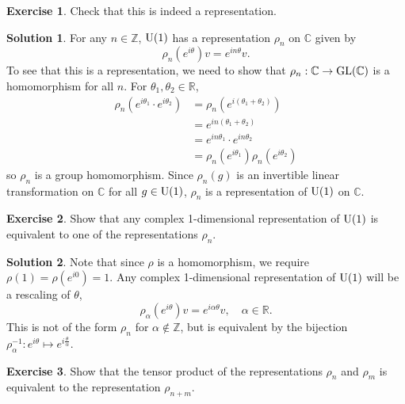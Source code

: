 \documentclass[11pt, a4paper]{report}
\theoremstyle{definition}
\newtheorem{ex}{Exercise}[part]
\newtheorem{sol}{Solution}[part]
\newcommand*{\GL}{\ensuremath\text{GL}}
\newcommand*{\U}{\ensuremath\text{U}}
\begin{document}
\begin{ex}

Check that this is indeed a representation.

\end{ex}

\begin{sol}

For any $n \in \mathbb{Z}$, $\U(1)$ has a representation $\rho_n$ on $\mathbb{C}$ given by
\[
    \rho_n(e^{i\theta}) v = e^{in\theta} v.
\]
To see that this is a representation, we need to show that $\rho_n: \mathbb{C} \to \GL(\mathbb{C})$ is a homomorphism for all $n$.
For $\theta_1, \theta_2 \in \mathbb{R}$,
\begin{align*}
    \rho_n(e^{i\theta_1} \cdot e^{i\theta_2}) &= \rho_n(e^{i(\theta_1 + \theta_2)}) \\
        &= e^{in(\theta_1 + \theta_2)} \\
        &= e^{in\theta_1} \cdot e^{in\theta_2} \\
        &= \rho_n(e^{i\theta_1}) \rho_n(e^{i\theta_2})
\end{align*}
so $\rho_n$ is a group homomorphism. Since $\rho_n(g)$ is an invertible linear transformation on $\mathbb{C}$ for all $g \in \U(1)$, $\rho_n$ is a representation of $\U(1)$ on $\mathbb{C}$.

\end{sol}

\begin{ex}

Show that any complex 1-dimensional representation of $\U(1)$ is equivalent to one of the representations $\rho_n$.

\end{ex}

\begin{sol}

Note that since $\rho$ is a homomorphism, we require $\rho(1) = \rho(e^{i0}) = 1$.
Any complex 1-dimensional representation of $\U(1)$ will be a rescaling of $\theta$,
\[
    \rho_\alpha(e^{i\theta}) v = e^{i\alpha\theta}v, \quad \alpha \in \mathbb{R}.
\]
This is not of the form $\rho_n$ for $\alpha \not\in \mathbb{Z}$, but is equivalent by the bijection $\rho_\alpha^{-1}: e^{i\theta} \mapsto e^{i \frac{\theta}{\alpha}}$.

\end{sol}

\begin{ex}

Show that the tensor product of the representations $\rho_n$ and $\rho_m$ is equivalent to the representation $\rho_{n + m}$.

\end{ex}
\end{document}
